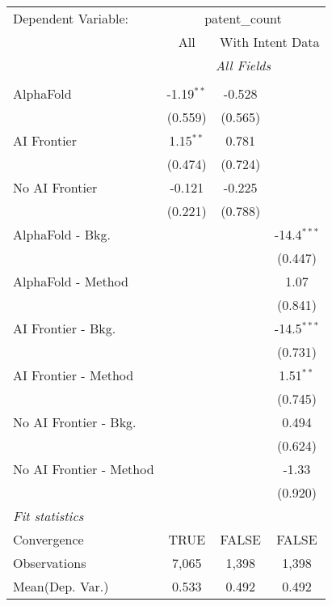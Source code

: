 \begingroup
\centering
\begin{tabular}{lccc}
   \tabularnewline \midrule \midrule
   Dependent Variable: & \multicolumn{3}{c}{patent\_count}\\
 & \multicolumn{1}{c}{All} & \multicolumn{2}{c}{With Intent Data} \\
\cmidrule(lr){2-2} \cmidrule(lr){3-4}
 & \multicolumn{3}{c}{\textit{All Fields}} \\ \\
   AlphaFold               & -1.19$^{**}$ & -0.528  &   \\   
                           & (0.559)      & (0.565) &   \\   
   AI Frontier             & 1.15$^{**}$  & 0.781   &   \\   
                           & (0.474)      & (0.724) &   \\   
   No AI Frontier          & -0.121       & -0.225  &   \\   
                           & (0.221)      & (0.788) &   \\   
   AlphaFold - Bkg.        &              &         & -14.4$^{***}$\\   
                           &              &         & (0.447)\\   
   AlphaFold - Method      &              &         & 1.07\\   
                           &              &         & (0.841)\\   
   AI Frontier - Bkg.      &              &         & -14.5$^{***}$\\   
                           &              &         & (0.731)\\   
   AI Frontier - Method    &              &         & 1.51$^{**}$\\   
                           &              &         & (0.745)\\   
   No AI Frontier - Bkg.   &              &         & 0.494\\   
                           &              &         & (0.624)\\   
   No AI Frontier - Method &              &         & -1.33\\   
                           &              &         & (0.920)\\   
   \midrule
   \emph{Fit statistics}\\
   Convergence             &TRUE          & FALSE   & FALSE\\  
   Observations            & 7,065        & 1,398   & 1,398\\  
Mean(Dep. Var.) & 0.533 & 0.492 & 0.492 \\
   

\end{tabular}
